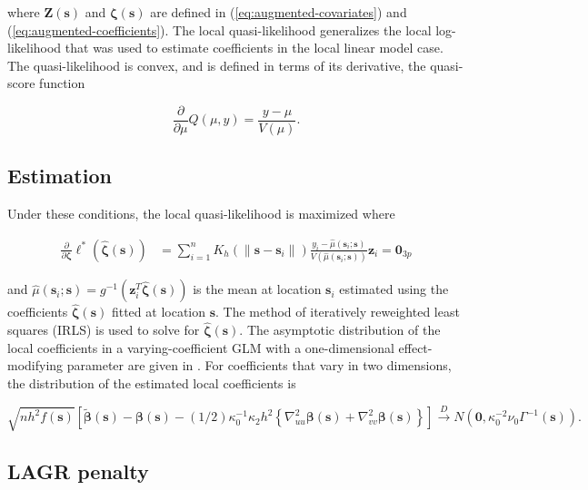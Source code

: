 \documentclass[12pt,english,authoryear, review]{article}\usepackage[]{graphicx}\usepackage[]{color}
\theoremstyle{plain}
\theoremstyle{plain}
\begin{document}
where $\bm{Z}\left(\bm{s}\right)$ and $\bm{\zeta}\left(\bm{s}\right)$
are defined in (\ref{eq:augmented-covariates}) and (\ref{eq:augmented-coefficients}).
The local quasi-likelihood generalizes the local log-likelihood that
was used to estimate coefficients in the local linear model case.
The quasi-likelihood is convex, and is defined in terms of its derivative,
the quasi-score function

\[
\frac{\partial}{\partial\mu}Q\left(\mu,y\right)=\frac{y-\mu}{V\left(\mu\right)}.
\]



\subsection{Estimation}

Under these conditions, the local quasi-likelihood is maximized where

\begin{align}
\frac{\partial}{\partial\bm{\zeta}}\mathcal{\ell}^{*}\left(\hat{\bm{\zeta}}\left(\bm{s}\right)\right) & =\sum_{i=1}^{n}K_{h}\left(\|\bm{s}-\bm{s}_{i}\|\right)\frac{y_{i}-\hat{\mu}\left(\bm{s}_{i};\bm{s}\right)}{V\left(\hat{\mu}\left(\bm{s}_{i};\bm{s}\right)\right)}\bm{z}_{i}=\bm{0}_{3p}
\end{align}


and $\hat{\mu}\left(\bm{s}_{i};\bm{s}\right)=g^{-1}\left(\bm{z}_{i}^{T}\hat{\bm{\zeta}}\left(\bm{s}\right)\right)$
is the mean at location $\bm{s}_{i}$ estimated using the coefficients
$\hat{\bm{\zeta}}\left(\bm{s}\right)$ fitted at location $\bm{s}$.
The method of iteratively reweighted least squares (IRLS) is used
to solve for $\hat{\bm{\zeta}}\left(\bm{s}\right)$. The asymptotic
distribution of the local coefficients in a varying-coefficient GLM
with a one-dimensional effect-modifying parameter are given in \citet{Cai-Fan-Li-2000}.
For coefficients that vary in two dimensions, the distribution of
the estimated local coefficients is

\[
\sqrt{{nh^{2}f(\bm{{s}})}}\left[\tilde{\bm{\beta}}(\bm{s})-\bm{\beta}(\bm{s})-(1/2)\kappa_{0}^{-1}\kappa_{2}h^{2}\left\{ \nabla_{uu}^{2}\bm{\beta}(\bm{s})+\nabla_{vv}^{2}\bm{\beta}(\bm{s})\right\} \right]\xrightarrow{{D}}N\left(\bm{0},\kappa_{0}^{-2}\nu_{0}\Gamma^{-1}(\bm{s})\right).
\]



\subsection{LAGR penalty}
\end{document}
